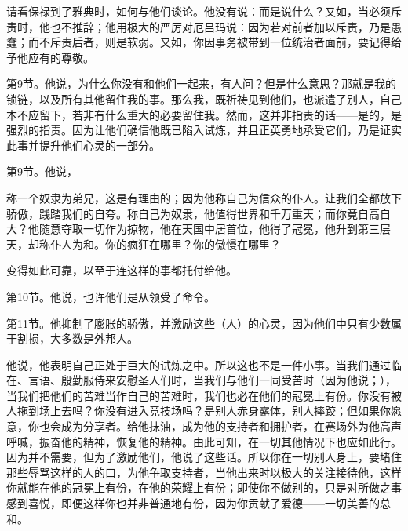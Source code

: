 请看保禄到了雅典时，如何与他们谈论。他没有说：而是说什么？又如，当必须斥责时，他也不推辞；他用极大的严厉对厄吕玛说：因为若对前者加以斥责，乃是愚蠢；而不斥责后者，则是软弱。又如，你因事务被带到一位统治者面前，要记得给予他应有的尊敬。\par

第9节。他说，为什么你没有和他们一起来，有人问？但是什么意思？那就是我的锁链，以及所有其他留住我的事。那么我，既祈祷见到他们，也派遣了别人，自己本不应留下，若非有什么重大的必要留住我。然而，这并非指责的话——是的，是强烈的指责。因为让他们确信他既已陷入试炼，并且正英勇地承受它们，乃是证实此事并提升他们心灵的一部分。\par

第9节。他说，\par

称一个奴隶为弟兄，这是有理由的；因为他称自己为信众的仆人。让我们全都放下骄傲，践踏我们的自夸。称自己为奴隶，他值得世界和千万重天；而你竟自高自大？他随意夺取一切作为掠物，他在天国中居首位，他得了冠冕，他升到第三层天，却称仆人为和。你的疯狂在哪里？你的傲慢在哪里？\par

变得如此可靠，以至于连这样的事都托付给他。\par

第10节。他说，也许他们是从领受了命令。\par

第11节。他抑制了膨胀的骄傲，并激励这些（人）的心灵，因为他们中只有少数属于割损，大多数是外邦人。\par

他说，他表明自己正处于巨大的试炼之中。所以这也不是一件小事。当我们通过临在、言语、殷勤服侍来安慰圣人们时，当我们与他们一同受苦时（因为他说；），当我们把他们的苦难当作自己的苦难时，我们也必在他们的冠冕上有份。你没有被人拖到场上去吗？你没有进入竞技场吗？是别人赤身露体，别人摔跤；但如果你愿意，你也会成为分享者。给他抹油，成为他的支持者和拥护者，在赛场外为他高声呼喊，振奋他的精神，恢复他的精神。由此可知，在一切其他情况下也应如此行。因为并不需要，但为了激励他们，他说了这些话。所以你在一切别人身上，要堵住那些辱骂这样的人的口，为他争取支持者，当他出来时以极大的关注接待他，这样你就能在他的冠冕上有份，在他的荣耀上有份；即使你不做别的，只是对所做之事感到喜悦，即便这样你也并非普通地有份，因为你贡献了爱德——一切美善的总和。\par

